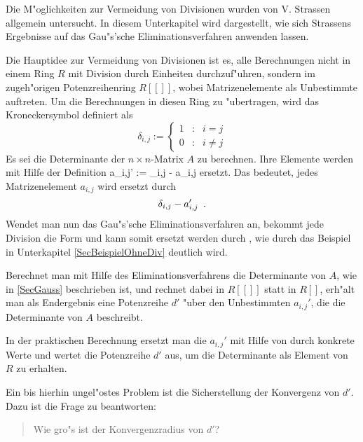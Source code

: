 \label{SecGaussOhneDiv}

Die M"oglichkeiten zur Vermeidung von Divisionen wurden von V. Strassen
\cite{Stra73} allgemein untersucht. In diesem Unterkapitel wird dargestellt,
wie sich Strassens Ergebnisse auf das Gau"s'sche Eliminationsverfahren
anwenden lassen.

Die Hauptidee zur Vermeidung von Divisionen ist es, alle Berechnungen nicht
in einem Ring $R$ mit Division durch Einheiten
durchzuf"uhren, sondern im zugeh"origen Potenzreihenring $R[[]]$, wobei
Matrizenelemente als Unbestimmte auftreten. Um die
Berechnungen in diesen Ring zu "ubertragen, wird das
Kroneckersymbol  definiert als
\[ \delta_{i,j} :=
       \left\{
           \begin{array}{rcl}
               1 & : & i = j \\
               0 & : & i \neq j
           \end{array}
       \right.
\]
Es sei die Determinante der $n \times n$-Matrix $A$ zu berechnen. Ihre
Elemente werden mit Hilfe der Definition
    a_{i,j}' := \delta_{i,j} - a_{i,j}
\Eeq
ersetzt. Das bedeutet, jedes
Matrizenelement $a_{i,j}$ wird ersetzt durch
\[ \delta_{i,j} - a_{i,j}' \mbox{\hspace{0.5em}.} \]
Wendet man nun das Gau"s'sche Eliminationsverfahren an, bekommt jede
Division die Form  und kann somit ersetzt werden
durch , wie durch das Beispiel in
Unterkapitel \ref{SecBeispielOhneDiv} deutlich wird.

Berechnet man mit Hilfe des Eliminationsverfahrens die Determinante von
$A$, wie in \ref{SecGauss} beschrieben ist, und rechnet dabei in 
$R[[]]$ statt in $R[]$, erh"alt man als Endergebnis eine Potenzreihe $d'$
"uber den Unbestimmten $a_{i,j}'$,
die die Determinante von $A$ beschreibt.

In der praktischen Berechnung ersetzt man die $a_{i,j}'$ mit Hilfe von 
 durch konkrete Werte und wertet die 
Potenzreihe $d'$ aus, um die Determinante als Element von $R$ zu erhalten.

Ein bis hierhin ungel"ostes Problem ist die Sicherstellung der Konvergenz
von $d'$. Dazu ist die Frage zu beantworten:
\begin{quote}
    Wie gro"s ist der Konvergenzradius von $d'$?
\end{quote}

